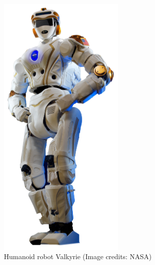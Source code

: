 \begin{figure}
\begin{minipage}{0.5\textwidth}
\centering
\includegraphics[width=0.55\textwidth]{images/valkyrie/Valkyrie.jpg}
\caption[Valkyrie]{Humanoid robot Valkyrie (Image credits: NASA)}
\label{fig:valkyrie}
\end{minipage}
%
\hspace{0.2cm}
%
\begin{minipage}{0.5\textwidth}
\centering
{}


\end{minipage}
\end{figure}
